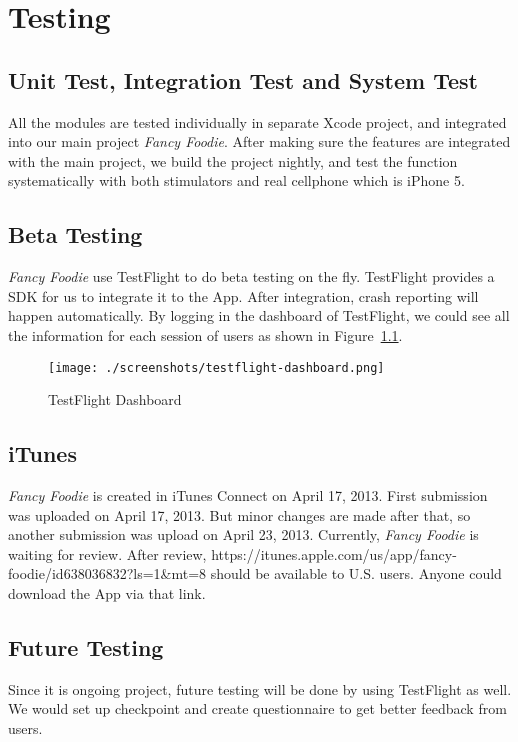 \chapter{Testing} %
\label{cha:testing}

\section{Unit Test, Integration Test and System Test} %
\label{sec:unit_test_integration_test_and_system_test}
	
	All the modules are tested individually in separate Xcode project, and integrated into our main project \emph{Fancy Foodie}. After making sure the features are integrated with the main project, we build the project nightly, and test the function systematically with both stimulators and real cellphone which is iPhone 5.

\section{Beta Testing} %
\label{sec:beta_testing}

	\emph{Fancy Foodie} use TestFlight to do beta testing on the fly. TestFlight provides a SDK for us to integrate it to the App. After integration, crash reporting will happen automatically. By logging in the dashboard of TestFlight, we could see all the information for each session of users as shown in Figure~\ref{fig:testflight-dashboard}.

\begin{figure}
	\centering
    {\texttt{[image: ./screenshots/testflight-dashboard.png]}}
    \caption{TestFlight Dashboard}
	\label{fig:testflight-dashboard}
\end{figure}


\section{iTunes} %
\label{sec:itunes}

	\emph{Fancy Foodie} is created in iTunes Connect on April 17, 2013. First submission was uploaded on April 17, 2013. But minor changes are made after that, so another submission was upload on April 23, 2013. Currently, \emph{Fancy Foodie} is waiting for review. After review, https://itunes.apple.com/us/app/fancy-foodie/id638036832?ls=1&mt=8 should be available to U.S. users. Anyone could download the App via that link.

\section{Future Testing} %
\label{sec:future_testing}

Since it is ongoing project, future testing will be done by using TestFlight as well. We would set up checkpoint and create questionnaire to get better feedback from users. 
